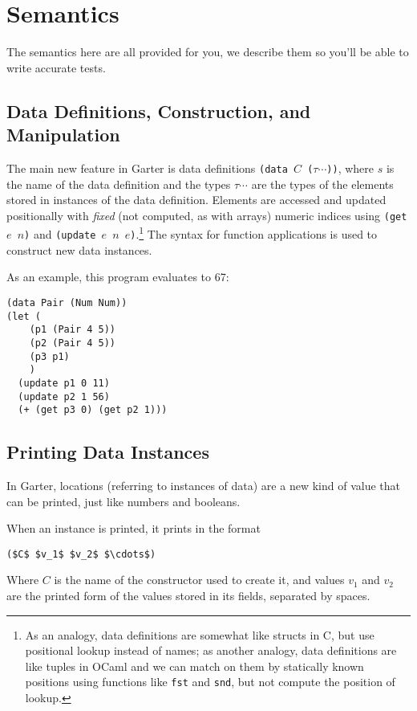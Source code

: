 \documentclass[10pt, oneside]{article}
\begin{document}
\section*{Semantics}

The semantics here are all provided for you, we describe them so you'll be
able to write accurate tests.

\subsection*{Data Definitions, Construction, and Manipulation}

The main new feature in Garter is data definitions \texttt{(data $C$
($\tau \cdots$))}, where $s$ is the name of the data definition and the types
$\tau \cdots$ are the types of the elements stored in instances of the data
definition. Elements are accessed and updated positionally with \emph{fixed}
(not computed, as with arrays) numeric indices using \texttt{(get $e$ $n$)}
and \texttt{(update $e$ $n$ $e$)}.\footnote{As an analogy, data definitions
are somewhat like structs in C, but use positional lookup instead of names;
as another analogy, data definitions are like tuples in OCaml and we can
match on them by statically known positions using functions like {\tt fst}
and {\tt snd}, but not compute the position of lookup.} The syntax for
function applications is used to construct new data instances.

As an example, this program evaluates to 67:

\begin{lstlisting}
(data Pair (Num Num))
(let (
    (p1 (Pair 4 5))
    (p2 (Pair 4 5))
    (p3 p1)
    )
  (update p1 0 11)
  (update p2 1 56)
  (+ (get p3 0) (get p2 1)))
\end{lstlisting}

\subsection*{Printing Data Instances}

In Garter, locations (referring to instances of data) are a new kind of
value that can be printed, just like numbers and booleans.

When an instance is printed, it prints in the format

\begin{lstlisting}
($C$ $v_1$ $v_2$ $\cdots$)
\end{lstlisting}

Where $C$ is the name of the constructor used to create it, and values $v_1$
and $v_2$ are the printed form of the values stored in its fields, separated
by spaces.
\end{document}
